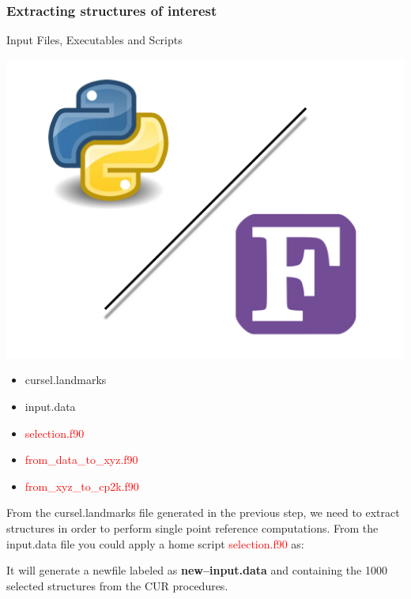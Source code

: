 \documentclass[12pt]{article}
\begin{document}
\subsubsection{Extracting structures of interest}
\begin{mybox2}{{Input Files, Executables and Scripts}}
\begin{minipage}[c]{0.5\linewidth}
\includegraphics[scale=0.1]{Python-fortran.jpeg}
\end{minipage}
\begin{minipage}[c]{0.5\linewidth}
\begin{itemize}
    \item cursel.landmarks
    \item input.data
    \item \textcolor{red}{selection.f90}
    \item \textcolor{red}{from\_data\_to\_xyz.f90}
    \item \textcolor{red}{from\_xyz\_to\_cp2k.f90}
\end{itemize}
\end{minipage}
\end{mybox2}
From the cursel.landmarks file generated in the previous step, we need to extract structures in order to perform single point reference computations. From the input.data file you could apply a home script \textcolor{red}{selection.f90} as:
\begin{center}
\end{center}
It will generate a newfile labeled as \textbf{new--input.data} and containing the 1000 selected structures from the CUR procedures. 
\end{document}

